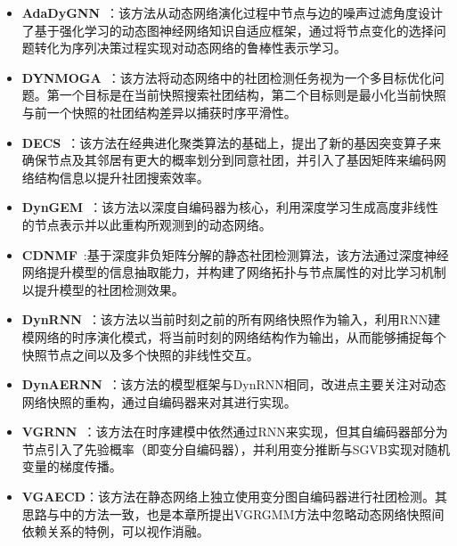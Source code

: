 \begin{itemize}
 	\item \textbf{AdaDyGNN}~\cite{Li2024DyGNN}：该方法从动态网络演化过程中节点与边的噪声过滤角度设计了基于强化学习的动态图神经网络知识自适应框架，通过将节点变化的选择问题转化为序列决策过程实现对动态网络的鲁棒性表示学习。
    \item \textbf{DYNMOGA}~\cite{folino2013evolutionary}：该方法将动态网络中的社团检测任务视为一个多目标优化问题。第一个目标是在当前快照搜索社团结构，第二个目标则是最小化当前快照与前一个快照的社团结构差异以捕获时序平滑性。
    \item \textbf{DECS}~\cite{liu2020detecting}：该方法在经典进化聚类算法的基础上，提出了新的基因突变算子来确保节点及其邻居有更大的概率划分到同意社团，并引入了基因矩阵来编码网络结构信息以提升社团搜索效率。
    \item \textbf{DynGEM}~\cite{goyal2018dyngem}：该方法以深度自编码器为核心，利用深度学习生成高度非线性的节点表示并以此重构所观测到的动态网络。
	\item \textbf{CDNMF}~\cite{li2024contrastive}:基于深度非负矩阵分解的静态社团检测算法，该方法通过深度神经网络提升模型的信息抽取能力，并构建了网络拓扑与节点属性的对比学习机制以提升模型的社团检测效果。
    \item \textbf{DynRNN}~\cite{goyal2020dyngraph2vec}：该方法以当前时刻之前的所有网络快照作为输入，利用RNN建模网络的时序演化模式，将当前时刻的网络结构作为输出，从而能够捕捉每个快照节点之间以及多个快照的非线性交互。
    \item \textbf{DynAERNN}~\cite{goyal2020dyngraph2vec}：该方法的模型框架与DynRNN相同，改进点主要关注对动态网络快照的重构，通过自编码器来对其进行实现。
    \item \textbf{VGRNN}~\cite{hajiramezanali2019variational}：该方法在时序建模中依然通过RNN来实现，但其自编码器部分为节点引入了先验概率（即变分自编码器），并利用变分推断与SGVB实现对随机变量的梯度传播。
    \item \textbf{VGAECD}：该方法在静态网络上独立使用变分图自编码器进行社团检测。其思路与\cite{choong2018learning}中的方法一致，也是本章所提出VGRGMM方法中忽略动态网络快照间依赖关系的特例，可以视作消融。
\end{itemize}


